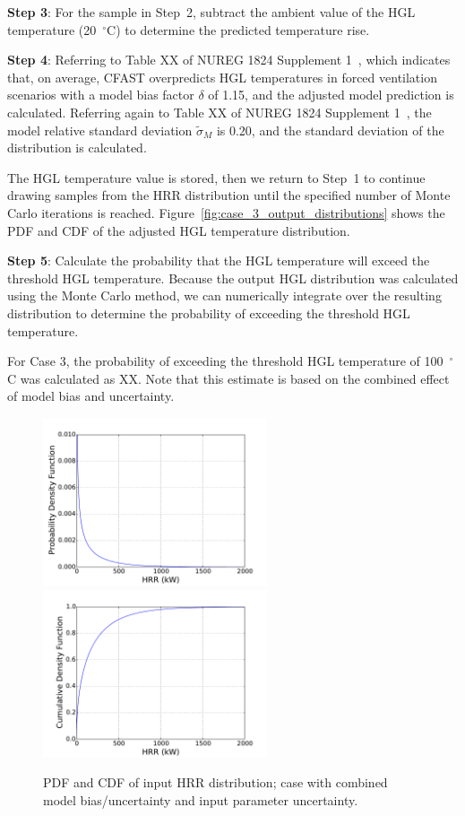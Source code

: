\documentclass[12pt]{article}
\begin{document}
\textbf{Step 3}: For the sample in Step~2, subtract the ambient value of the HGL temperature (20~$^\circ$C) to determine the predicted temperature rise.

\textbf{Step 4}: Referring to Table XX of NUREG 1824 Supplement 1~\cite{NUREG_1824_Sup_1}, which indicates that, on average, CFAST overpredicts HGL temperatures in forced ventilation scenarios with a model bias factor $\delta$ of 1.15, and the adjusted model prediction is calculated. Referring again to Table XX of NUREG 1824 Supplement 1~\cite{NUREG_1824_Sup_1}, the model relative standard deviation $\widetilde\sigma_M$ is 0.20, and the standard deviation of the distribution is calculated.

The HGL temperature value is stored, then we return to Step~1 to continue drawing samples from the HRR distribution until the specified number of Monte Carlo iterations is reached. Figure~\ref{fig:case_3_output_distributions} shows the PDF and CDF of the adjusted HGL temperature distribution.

\textbf{Step 5}: Calculate the probability that the HGL temperature will exceed the threshold HGL temperature. Because the output HGL distribution was calculated using the Monte Carlo method, we can numerically integrate over the resulting distribution to determine the probability of exceeding the threshold HGL temperature.

For Case 3, the probability of exceeding the threshold HGL temperature of 100~$^\circ$C was calculated as XX. Note that this estimate is based on the combined effect of model bias and uncertainty.


\clearpage


\begin{figure}[p]
\includegraphics[width=2.6in]{Figures/input_PDF}
\includegraphics[width=2.6in]{Figures/input_CDF}
\caption{PDF and CDF of input HRR distribution; case with combined model bias/uncertainty and input parameter uncertainty.}
\label{fig:case_3_input_distributions}
\end{figure}
\end{document}
